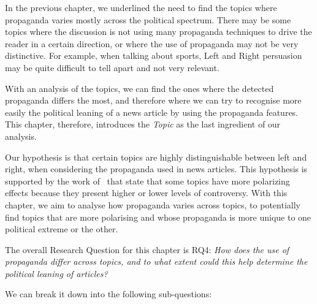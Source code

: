 In the previous chapter, we underlined the need to find the topics where propaganda varies mostly across the political spectrum. There may be some topics where the discussion is not using many propaganda techniques to drive the reader in a certain direction, or where the use of propaganda may not be very distinctive.
For example, when talking about sports, Left and Right persuasion may be quite difficult to tell apart and not very relevant. 

With an analysis of the topics, we can find the ones where the detected propaganda differs the most, and therefore where we can try to recognise more easily the political leaning of a news article by using the propaganda features.
This chapter, therefore, introduces the \emph{Topic} as the last ingredient of our analysis.

Our hypothesis is that certain topics are highly distinguishable between left and right, when considering the propaganda used in news articles.
This hypothesis is supported by the work of~\citet{garimella2018quantifying,treuillier2022being} that state that some topics have more polarizing effects because they present higher or lower levels of controversy.
With this chapter, we aim to analyse how propaganda varies across topics, to potentially find topics that are more polarising and whose propaganda is more unique to one political extreme or the other.






The overall Research Question for this chapter is RQ4: \emph{How does the use of propaganda differ across topics, and to what extent could this help determine the political leaning of articles?}

We can break it down into the following sub-questions:

